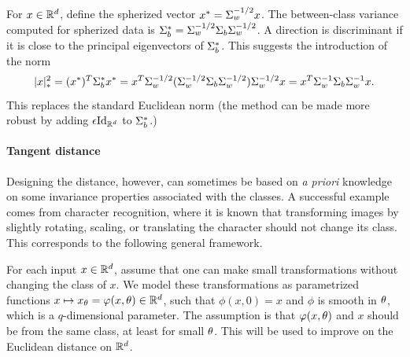 For $x\in{\mathbb{R}}^d$, define the spherized vector
$x^* = \Sigma_w^{-1/2} x$. The between-class variance computed for spherized
data is $\Sigma_b^* = \Sigma_w^{-1/2} \Sigma_b \Sigma_w^{-1/2}$. A direction is discriminant if it
is close to the principal eigenvectors of $\Sigma_b^*$. This suggests the
introduction of the norm
$$
|x|_*^2  = (x^*)^T \Sigma_b^* x^* = x^T \Sigma_w^{-1/2}
(\Sigma_w^{-1/2}\Sigma_b\Sigma_w^{-1/2})\Sigma_w^{-1/2}x = x^T \Sigma_w^{-1}\Sigma_b\Sigma_w^{-1}x.
$$
This replaces the standard Euclidean norm (the method can be made more
robust by adding $\ep\Id[d]$ to $\Sigma_b^*$.)

\paragraph{Tangent distance}
Designing the distance, however, can sometimes be based on {\it a
priori} knowledge on some invariance properties associated with the classes. A successful example comes from
character recognition, where it is known that transforming images by
slightly rotating, scaling, or translating the character should not
change its class. This corresponds to the following general framework.

For each input $x\in{\mathbb{R}}^d$, assume that one can make small transformations without
changing the class of $x$. We model these transformations as
parametrized functions $x \mapsto x_\theta = \varphi(x, \theta)\in{\mathbb{R}}^d$, such that $\phi(x,
0) = x$ and $\phi$ is smooth in $\theta$, which is a $q$-dimensional parameter. The assumption is that $\varphi(x, \theta)$
and $x$ should be from the same class, at least for small $\theta$. This
will be used to improve on the Euclidean distance on ${\mathbb{R}}^d$.

